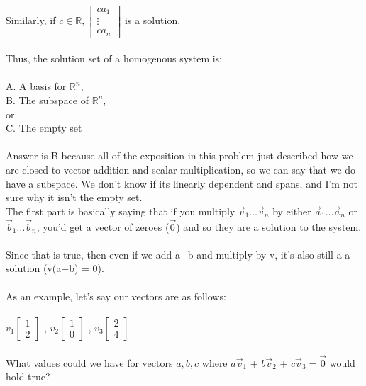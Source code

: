\documentclass{article}
\begin{document}
{\\
Similarly, if $c \in \mathbb{R}, \left[ \begin{matrix} ca_{1}\\ \vdots \\ ca_{n} \end{matrix} \right]$ is a solution. \\
\\
Thus, the solution set of a homogenous system is:\\
\\
A. A basis for $\mathbb{R}^{n}$,\\
B. The subspace of $\mathbb{R}^{n}$,\\
or\\
C. The empty set\\
\\
Answer is B because all of the exposition in this problem just described how we are closed to vector addition and scalar multiplication, so we can say that we do have a subspace. We don't know if its linearly dependent and spans, and I'm not sure why it isn't the empty set.
\\
The first part is basically saying that if you multiply $\vec{v}_{1} \dots \vec{v}_n$ by either $\vec{a}_{1} \dots \vec{a}_n$ or $\vec{b}_{1} \dots \vec{b}_n$, you'd get a vector of zeroes ($\vec{0}$) and so they are a solution to the system.\\
\\
Since that is true, then even if we add a+b and multiply by v, it's also still a a solution (v(a+b) = 0).\\
\\
As an example, let's say our vectors are as follows:\\
\\
$ v_{1} \left[ \begin{matrix} 1 \\ 2 \end{matrix}\right]$ ,
$ v_{2} \left[ \begin{matrix} 1 \\ 0 \end{matrix}\right]$ ,
$ v_{3} \left[ \begin{matrix} 2 \\ 4 \end{matrix}\right]$ \\
\\
What values could we have for vectors $a, b, c$ where  $a\vec{v}_{1}$ + $b\vec{v}_{2}$ + $c\vec{v}_{3} = \vec{0}$ would hold true?\\
}
\end{document}

